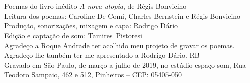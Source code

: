 \pagebreak

\chapter*{}

Poemas do livro inédito \emph{A nova utopia}, de Régis Bonvicino\\
Leitura dos poemas: Caroline De Comi, Charles Bernstein e Régis Bonvicino\\
Produção, sonorizações, mixagem e capa: Rodrigo Dário\\
Edição e captação de som: Tamires~Pistoresi\\
Agradeço a Roque Andrade ter acolhido meu projeto de gravar os poemas.\\
Agradeço-lhe também ter me apresentado a Rodrigo Dário. RB\\
Gravado em São Paulo, de março a julho de 2019, no estúdio espaço-som, Rua Teodoro Sampaio, 462 e 512, Pinheiros -- CEP: 05405-050
